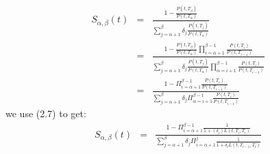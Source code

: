 \documentclass[11pt]{article}
\numberwithin{equation}{subsection}
\begin{document}
\begin{eqnarray}
S_{\alpha, \beta}(t) &=& \frac{1- \frac{P(t, T_{\beta})}{P(t, T_{\alpha})}}{\sum_{j=\alpha+1}^{\beta} \delta_{j} \frac{P(t, T_j)}{P(t, T_{\alpha})}} \\
&=& \frac{1- \frac{P(t, T_{\beta})}{P(t, T_{\alpha})} \prod_{i=\alpha+1}^{\beta-1}{\frac{P(t, T_i)}{P(t, T_{i-1})}}}{\sum_{j=\alpha+1}^{\beta} \delta_{j} \frac{P(t, T_j)}{P(t, T_{\alpha})} \prod_{\alpha=i+1}^{\beta-1}{\frac{P(t, T_i)}{P(t, T_{i-1})}} }  \\
&=& \frac{1-\Pi_{i=\alpha+1}^{\beta-1}{\frac{P(t, T_i)}{P(t, T_{i-1})}}}{\sum_{j=\alpha + 1}^{\beta} \delta_j \Pi_{\alpha=i+1}^{\beta-1}{\frac{P(t, T_i)}{P(t, T_{i-1})}}}
\end{eqnarray}
we use (2.7) to get:
\begin{eqnarray}
S_{\alpha, \beta}(t) &=& \frac{1-\Pi_{i=\alpha+1}^{\beta-1}{\frac{1}{1+(\delta_i)L(t, T_{i}, T_i)}}}{\sum_{j=\alpha + 1}^{\beta} \delta_j \Pi_{i=\alpha+1}^{j}{\frac{1}{1 + \delta_{i} L(t, T_{i-1}, T_i)}}}
\end{eqnarray}
\end{document}
